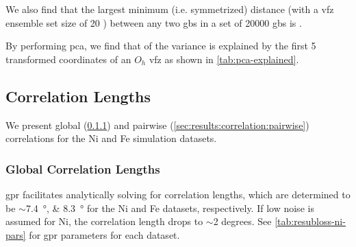 \documentclass[final,twocolumn,12pt]{elsarticle}
\begin{document}
	We also find that the largest minimum (i.e. symmetrized) distance (with a \gls{vfz} ensemble set size of 20 \cite{bairdFiveDegreeofFreedomPropertyUnderReview}) between any two \glspl{gb} in a set of \num{20000} \glspl{gb} is \minsymdist{}.
	
	By performing \gls{pca}, we find that \percExplained{} of the variance is explained by the first 5 transformed coordinates of an $O_h$ \gls{vfz} as shown in \cref{tab:pca-explained}.
	
	\begin{table}[!htb]
	    \centering
    	    \caption{Dimension of \gls{pca} transformed coordinates (Dimension) and percent variance explained ($\rho$) for a set of \num{50000} \glspl{vfzgbo}. The first 5 dimensions cumulatively explain \percExplained{} of the variance. }
    	    \label{tab:pca-explained}
	\end{table}	
	
	\subsection{Correlation Lengths} \label{sec:results:correlation}
	
	We present global (\cref{sec:results:correlation:global}) and pairwise (\cref{sec:results:correlation:pairwise}) correlations for the Ni and Fe simulation datasets.
	
	\subsubsection{Global Correlation Lengths} \label{sec:results:correlation:global}
	\Gls{gpr} facilitates analytically solving for correlation lengths, which are determined to be $\sim$\SIlist{7.4;8.3}{\degree} for the Ni and Fe datasets, respectively. If low noise is assumed for Ni, the correlation length drops to $\sim$2 degrees. See \cref{tab:resubloss-ni-pars} for \gls{gpr} parameters for each dataset.
	
	\begin{table}[]
	\centering
	\caption{Fitted parameters for two \gls{gpr} models fitted to the 388 simulated Ni \glspl{gbe} by \citet{olmstedSurveyComputedGrain2009a} and fitted parameters for a \gls{gpr} model trained on 80\% of the Fe simulation data (\num{46883} \glspl{gb}). The first Ni model allows $\sigma$ to vary, whereas the second constrains $\sigma$ to be fixed. Mat., $\sigma_L$, $\sigma_F$, $\beta$, and $\sigma$ are the material (i.e. element), kernel length scale ($^\circ{}$), signal standard deviation ($J m^{-2}$), constant basis function ($J m^{-2}$), and input property standard deviation ($J m^{-2}$), respectively. %
	}
	\label{tab:resubloss-ni-pars}
    \end{table}
    
\end{document}
